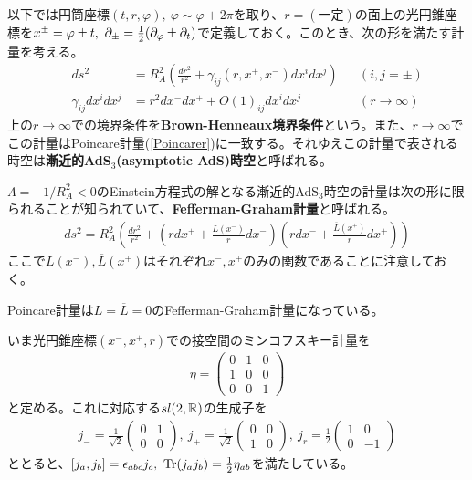 \begin{oframed}
以下では円筒座標$(t,r,\varphi),\ \varphi\sim \varphi+2\pi$を取り、$r=(\text{一定})$の面上の光円錐座標を$x^\pm=\varphi\pm t,\ \del_{\pm}=\frac{1}{2}(\del_\varphi\pm \del_t)$で定義しておく。このとき、次の形を満たす計量を考える。
\begin{align}
&&ds^2&=R_A^2\left(\frac{dr^2}{r^2}+\gamma_{ij}(r,x^+,x^-)dx^i dx^j\right)&&(i,j=\pm)\\
&&\gamma_{ij}dx^i dx^j&=r^2dx^- dx^+ +O(1)_{ij}dx^i dx^j&&(r\to\infty)
\end{align}
上の$r\to\infty$での境界条件を\textbf{Brown-Henneaux境界条件}\cite{Brown:1986nw}という。また、$r\to\infty$でこの計量はPoincare計量(\ref{Poincarer})に一致する。それゆえこの計量で表される時空は\textbf{漸近的AdS$_3$(asymptotic AdS)時空}と呼ばれる。

$\Lambda=-1/R_A ^2<0$のEinstein方程式の解となる漸近的AdS$_3$時空の計量は次の形に限られる\cite{Banados:1998gg}ことが知られていて、\textbf{Fefferman-Graham計量}\cite{FeffermanGraham}と呼ばれる。
\begin{align}\label{Feffermangraham}
ds^2=R_A^2\left(\frac{dr^2}{r^2}+\left(rdx^+ +\frac{L(x^-)}{r}dx^- \right)\left(rdx^- +\frac{\overline{L}(x^+)}{r}dx^+ \right)\right)
\end{align}
ここで$L(x^-),\overline{L}(x^+)$はそれぞれ$x^-,x^+$のみの関数であることに注意しておく。
\end{oframed}

Poincare計量は$L=\overline{L}=0$のFefferman-Graham計量になっている。

いま光円錐座標$(x^-,x^+,r)$での接空間のミンコフスキー計量を
\begin{align}
\eta=\left(\begin{array}{ccc}
0 & 1 & 0 \\
1 & 0 & 0 \\
0 & 0 & 1 \end{array}
\right)
\end{align}
と定める。これに対応する$sl(2,\mathbb{R})$の生成子を
\begin{align}
j_-=\frac{1}{\sqrt{2}}\left(\begin{array}{cc}
0 & 1 \\
0 & 0\end{array}
\right),\ 
j_+=\frac{1}{\sqrt{2}}\left(\begin{array}{cc}
0 & 0 \\
1 & 0\end{array}
\right),\ 
j_r=\frac{1}{2}\left(\begin{array}{cc}
1 & 0 \\
0 & -1\end{array}
\right)
\end{align}
ととると、$[j_a,j_b]=\epsilon_{abc}j_c,\ \Tr(j_aj_b)=\frac{1}{2}\eta_{ab}$を満たしている。


